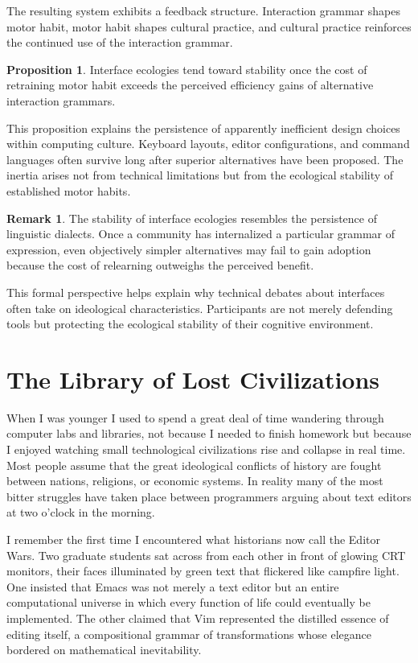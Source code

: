 \documentclass[11pt]{article}
\theoremstyle{definition}
\newtheorem{proposition}{Proposition}[section]
\newtheorem{remark}{Remark}[section]
\begin{document}
The resulting system exhibits a feedback structure. Interaction grammar
shapes motor habit, motor habit shapes cultural practice, and cultural
practice reinforces the continued use of the interaction grammar.

\begin{proposition}
Interface ecologies tend toward stability once the cost of retraining
motor habit exceeds the perceived efficiency gains of alternative
interaction grammars.
\end{proposition}

This proposition explains the persistence of apparently inefficient
design choices within computing culture. Keyboard layouts, editor
configurations, and command languages often survive long after superior
alternatives have been proposed. The inertia arises not from technical
limitations but from the ecological stability of established motor
habits.

\begin{remark}
The stability of interface ecologies resembles the persistence of
linguistic dialects. Once a community has internalized a particular
grammar of expression, even objectively simpler alternatives may fail
to gain adoption because the cost of relearning outweighs the perceived
benefit.
\end{remark}

This formal perspective helps explain why technical debates about
interfaces often take on ideological characteristics. Participants are
not merely defending tools but protecting the ecological stability of
their cognitive environment.

\section{The Library of Lost Civilizations}

When I was younger I used to spend a great deal of time wandering through
computer labs and libraries, not because I needed to finish homework but
because I enjoyed watching small technological civilizations rise and
collapse in real time. Most people assume that the great ideological
conflicts of history are fought between nations, religions, or economic
systems. In reality many of the most bitter struggles have taken place
between programmers arguing about text editors at two o'clock in the
morning.

I remember the first time I encountered what historians now call the
Editor Wars. Two graduate students sat across from each other in front
of glowing CRT monitors, their faces illuminated by green text that
flickered like campfire light. One insisted that Emacs was not merely a
text editor but an entire computational universe in which every function
of life could eventually be implemented. The other claimed that Vim
represented the distilled essence of editing itself, a compositional
grammar of transformations whose elegance bordered on mathematical
inevitability.
\end{document}
